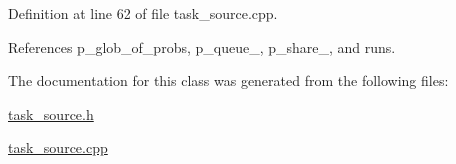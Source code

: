 \-Definition at line 62 of file task\-\_\-source.\-cpp.



\-References p\-\_\-glob\-\_\-of\-\_\-probs, p\-\_\-queue\-\_, p\-\_\-share\-\_, and runs.



\-The documentation for this class was generated from the following files\-:\begin{DoxyCompactItemize}
\item 
\hyperlink{task__source_8h}{task\-\_\-source.\-h}\item 
\hyperlink{task__source_8cpp}{task\-\_\-source.\-cpp}\end{DoxyCompactItemize}
